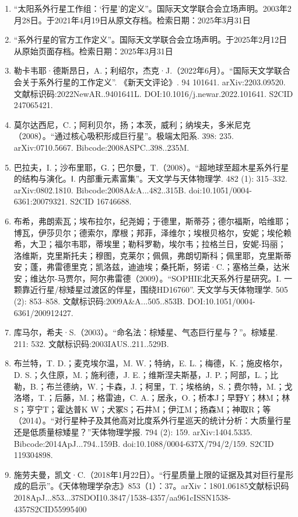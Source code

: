 \begin{enumerate}
\item “太阳系外行星工作组：‘行星’的定义”。国际天文学联合会立场声明。2003年2月28日。于2021年4月19日从原文存档。检索日期：2025年3月31日
\item “系外行星的官方工作定义”。国际天文学联合会立场声明。于2025年2月12日从原始页面存档。检索日期：2025年3月31日
\item 勒卡韦耶·德斯昂日，A.；利绍尔，杰克·J.（2022年6月）。“国际天文学联合会关于系外行星的工作定义”. 《新天文评论》. 94 101641. arXiv:2203.09520. 文献标识码:2022NewAR..9401641L. DOI:10.1016/j.newar.2022.101641. S2CID 247065421.
\item 莫尔达西尼，C.；阿利贝尔，扬；本茨，威利；纳埃夫，多米尼克（2008）。“通过核心吸积形成巨行星”。极端太阳系. 398: 235. arXiv:0710.5667. Bibcode:2008ASPC..398..235M.
\item 巴拉夫，I.；沙布里耶，G.；巴尔曼，T.（2008）。“超地球至超木星系外行星的结构与演化。Ⅰ. 内部重元素富集”。天文学与天体物理学. 482 (1): 315–332. arXiv:0802.1810. Bibcode:2008A&A...482..315B. doi:10.1051/0004-6361:20079321. S2CID 16746688.
\item 布希，弗朗索瓦；埃布拉尔，纪尧姆；于德里，斯蒂芬；德尔福斯，哈维耶；博瓦，伊莎贝尔；德索尔，摩根；邦菲，泽维尔；埃根贝格尔，安妮；埃伦赖希，大卫；福尔韦耶，蒂埃里；勒科罗勒，埃尔韦；拉格兰日，安妮-玛丽；洛维斯，克里斯托夫；穆图，克莱尔；佩佩，弗朗切斯科；佩里耶，克里斯蒂安；蓬，弗雷德里克；凯洛兹，迪迪埃；桑托斯，努诺·C.；塞格兰桑，达米安；维达尔-马贾尔，阿尔弗雷德（2009）。“SOPHIE北天系外行星研究。I. 一颗靠近行星/棕矮星过渡区的伴星，围绕HD16760”. 天文学与天体物理学. 505 (2): 853–858. 文献标识码:2009A&A...505..853B. DOI:10.1051/0004-6361/200912427.
\item 库马尔，希夫·S.（2003）。“命名法：棕矮星、气态巨行星与？”。棕矮星. 211: 532. 文献标识码:2003IAUS..211..529B.
\item 布兰特，T. D.；麦克埃尔温，M. W.；特纳，E. L.；梅德，K.；施皮格尔，D. S.；久住原，M.；施利德，J. E.；维斯涅夫斯基，J. P.；阿部，L.；比勒，B.；布兰德纳，W.；卡森，J.；柯里，T.；埃格纳，S.；费尔特，M.；戈洛塔，T.；后藤，M.；格雷迪，C. A.；居永，O.；桥本J；早野Y；林M；林S；亨宁T；霍达普K W；犬冢S；石井M；伊江M；扬森M；神取R；等（2014）。“对行星种子及其他高对比度系外行星巡天的统计分析：大质量行星还是低质量棕矮星？”天体物理学报. 794 (2): 159. arXiv:1404.5335. Bibcode:2014ApJ...794..159B. doi:10.1088/0004-637X/794/2/159. S2CID 119304898.
\item 施劳夫曼，凯文·C.（2018年1月22日）。“行星质量上限的证据及其对巨行星形成的启示”。《天体物理学杂志》853（1）：37。arXiv：1801.06185文献标识码2018ApJ...853...37SDOI10.3847/1538-4357/aa961cISSN1538-4357S2CID55995400

\end{enumerate}
